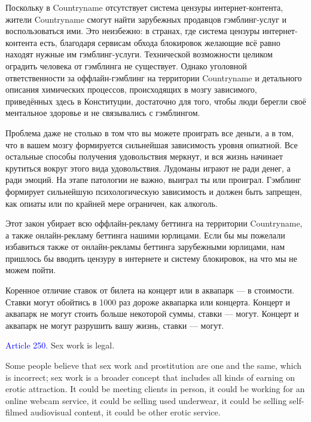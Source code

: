 \documentclass[11pt]{article}
\theoremstyle{remark}
\theoremstyle{definition}
\begin{document}
Поскольку в Countryname отсутствует система цензуры интернет-контента, жители Countryname смогут найти зарубежных продавцов гэмблинг-услуг и воспользоваться ими. Это неизбежно: в странах, где система цензуры интернет-контента есть, благодаря сервисам обхода блокировок желающие всё равно находят нужные им гэмблинг-услуги. Технической возможности целиком оградить человека от гэмблинга не существует. Однако уголовной ответственности за оффлайн-гэмблинг на территории Countryname и детального описания химических процессов, происходящих в мозгу зависимого, приведённых здесь в Конституции, достаточно для того, чтобы люди берегли своё ментальное здоровье и не связывались с гэмблингом.

Проблема даже не столько в том что вы можете проиграть все деньги, а в том, что в вашем мозгу формируется сильнейшая зависимость уровня опиатной. Все остальные способы получения удовольствия меркнут, и вся жизнь начинает крутиться вокруг этого вида удовольствия. Лудоманы играют не ради денег, а ради эмоций. На этапе патологии не важно, выиграл ты или проиграл. Гэмблинг формирует сильнейшую психологическую зависимость и должен быть запрещен, как опиаты или по крайней мере ограничен, как алкоголь.






Этот закон убирает всю оффлайн-рекламу беттинга на территории Countryname, а также онлайн-рекламу беттинга нашими юрлицами. Если бы мы пожелали избавиться также от онлайн-рекламы беттинга зарубежными юрлицами, нам пришлось бы вводить цензуру в интернете и систему блокировок, на что мы не можем пойти. 


Коренное отличие ставок от билета на концерт или в аквапарк --- в стоимости. Ставки могут обойтись в 1000 раз дороже аквапарка или концерта. Концерт и аквапарк не могут стоить больше некоторой суммы, ставки --- могут. Концерт и аквапарк не могут разрушить вашу жизнь, ставки --- могут.






\color{black}







\textcolor{blue}{Article 250.} Sex work is legal.

\color{blue}


Some people believe that sex work and prostitution are one and the same, which is incorrect; sex work is a broader concept that includes all kinds of earning on erotic attraction. It could be meeting clients in person, it could be working for an online webcam service, it could be selling used underwear, it could be selling self-filmed audiovisual content, it could be other erotic service.
\end{document}
